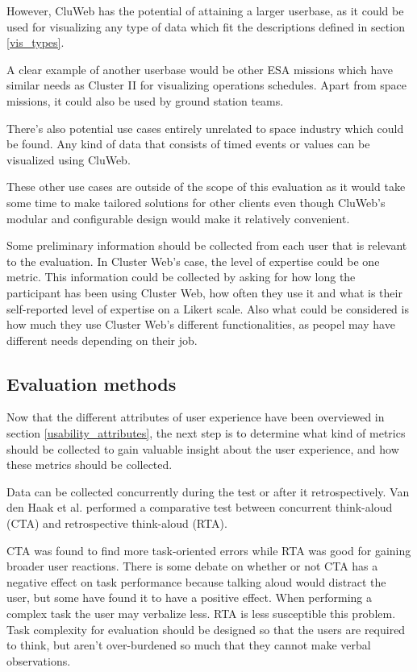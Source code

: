 However, CluWeb has the potential of attaining a larger userbase, as it could be used for visualizing any type of data which fit the descriptions defined in section \ref{vis_types}. 

A clear example of another userbase would be other ESA missions which have similar needs as Cluster II for visualizing operations schedules. Apart from space missions, it could also be used by ground station teams.

There's also potential use cases entirely unrelated to space industry which could be found. Any kind of data that consists of timed events or values can be visualized using CluWeb.

These other use cases are outside of the scope of this evaluation as it would take some time to make tailored solutions for other clients even though CluWeb's modular and configurable design would make it relatively convenient.

Some preliminary information should be collected from each user that is relevant to the evaluation. In Cluster Web's case, the level of expertise could be one metric. This information could be collected by asking for how long the participant has been using Cluster Web, how often they use it and what is their self-reported level of expertise on a Likert scale. \cite{likert1932technique} Also what could be considered is how much they use Cluster Web's different functionalities, as peopel may have different needs depending on their job.

\cite{rubin2008handbook, albert2013measuring}

\subsection{Evaluation methods}
Now that the different attributes of user experience have been overviewed in section \ref{usability_attributes}, the next step is to determine what kind of metrics should be collected to gain valuable insight about the user experience, and how these metrics should be collected.

Data can be collected concurrently during the test or after it retrospectively. Van den Haak et al. performed a comparative test between concurrent think-aloud (CTA) and retrospective think-aloud (RTA).

CTA was found to find more task-oriented errors while RTA was good for gaining broader user reactions. There is some debate on whether or not CTA has a negative effect on task performance because talking aloud would distract the user, but some have found it to have a positive effect. When performing a complex task the user may verbalize less. RTA is less susceptible this problem. Task complexity for evaluation should be designed so that the users are required to think, but aren't over-burdened so much that they cannot make verbal observations.
\cite{van2003retrospective}

